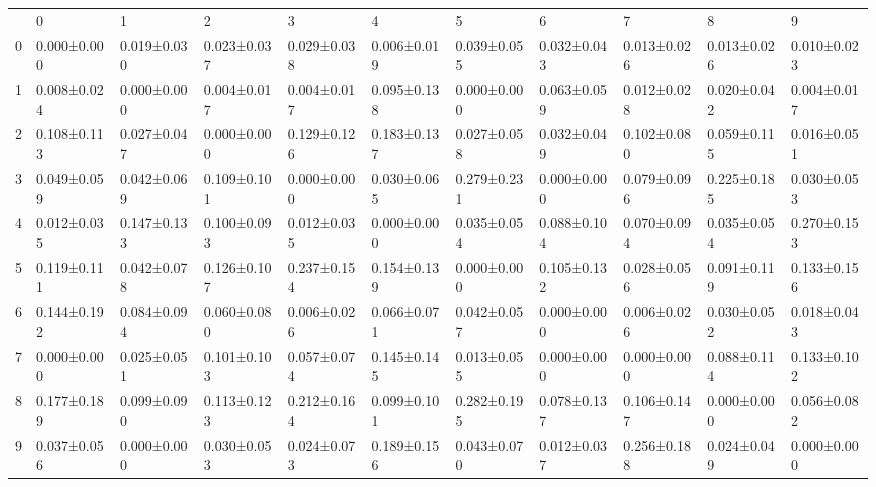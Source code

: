 \begin{tabular}{lllllllllll}
 & 0 & 1 & 2 & 3 & 4 & 5 & 6 & 7 & 8 & 9 \\
0 & 0.000±0.000 & 0.019±0.030 & 0.023±0.037 & 0.029±0.038 & 0.006±0.019 & 0.039±0.055 & 0.032±0.043 & 0.013±0.026 & 0.013±0.026 & 0.010±0.023 \\
1 & 0.008±0.024 & 0.000±0.000 & 0.004±0.017 & 0.004±0.017 & 0.095±0.138 & 0.000±0.000 & 0.063±0.059 & 0.012±0.028 & 0.020±0.042 & 0.004±0.017 \\
2 & 0.108±0.113 & 0.027±0.047 & 0.000±0.000 & 0.129±0.126 & 0.183±0.137 & 0.027±0.058 & 0.032±0.049 & 0.102±0.080 & 0.059±0.115 & 0.016±0.051 \\
3 & 0.049±0.059 & 0.042±0.069 & 0.109±0.101 & 0.000±0.000 & 0.030±0.065 & 0.279±0.231 & 0.000±0.000 & 0.079±0.096 & 0.225±0.185 & 0.030±0.053 \\
4 & 0.012±0.035 & 0.147±0.133 & 0.100±0.093 & 0.012±0.035 & 0.000±0.000 & 0.035±0.054 & 0.088±0.104 & 0.070±0.094 & 0.035±0.054 & 0.270±0.153 \\
5 & 0.119±0.111 & 0.042±0.078 & 0.126±0.107 & 0.237±0.154 & 0.154±0.139 & 0.000±0.000 & 0.105±0.132 & 0.028±0.056 & 0.091±0.119 & 0.133±0.156 \\
6 & 0.144±0.192 & 0.084±0.094 & 0.060±0.080 & 0.006±0.026 & 0.066±0.071 & 0.042±0.057 & 0.000±0.000 & 0.006±0.026 & 0.030±0.052 & 0.018±0.043 \\
7 & 0.000±0.000 & 0.025±0.051 & 0.101±0.103 & 0.057±0.074 & 0.145±0.145 & 0.013±0.055 & 0.000±0.000 & 0.000±0.000 & 0.088±0.114 & 0.133±0.102 \\
8 & 0.177±0.189 & 0.099±0.090 & 0.113±0.123 & 0.212±0.164 & 0.099±0.101 & 0.282±0.195 & 0.078±0.137 & 0.106±0.147 & 0.000±0.000 & 0.056±0.082 \\
9 & 0.037±0.056 & 0.000±0.000 & 0.030±0.053 & 0.024±0.073 & 0.189±0.156 & 0.043±0.070 & 0.012±0.037 & 0.256±0.188 & 0.024±0.049 & 0.000±0.000 \\
\end{tabular}
